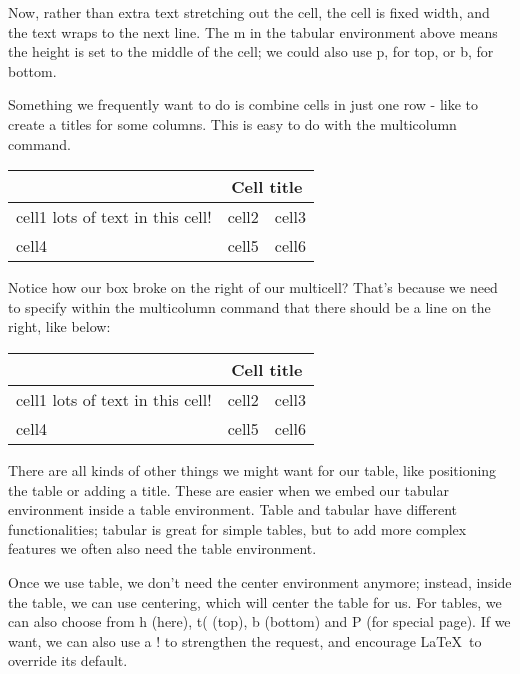 \documentclass{article}
\begin{document}
Now, rather than extra text stretching out the cell, the cell is fixed width, and the text wraps to the next line. The m in the tabular environment above means the height is set to the middle of the cell; we could also use p, for top, or b, for bottom.

Something we frequently want to do is combine cells in just one row - like to create a titles for some columns. This is easy to do with the multicolumn command.

\begin{center}
	\begin{tabular}{ | m{3cm} | m{1cm}| m{1cm} | } 
		\hline
		 & \multicolumn{2}{c}{Cell title} \\
		\hline
		cell1 lots of text in this cell! & cell2 & cell3 \\ 
		\hline
		cell4 & cell5 & cell6 \\ 
		\hline
	\end{tabular}
\end{center}


Notice how our box broke on the right of our multicell? That's because we need to specify within the multicolumn command that there should be a line on the right, like below:

\begin{center}
	\begin{tabular}{ | m{3cm} | m{1cm}| m{1cm} | } 
		\hline
		& \multicolumn{2}{c|}{Cell title}  \\
		\hline
		cell1 lots of text in this cell! & cell2 & cell3 \\ 
		\hline
		cell4 & cell5 & cell6 \\ 
		\hline
	\end{tabular}
\end{center}

There are all kinds of other things we might want for our table, like positioning the table or adding a title. These are easier when we embed our tabular environment inside a table environment. Table and tabular have different functionalities; tabular is great for simple tables, but to add more complex features we often also need the table environment.

Once we use table, we don't need the center environment anymore; instead, inside the table, we can use centering, which will center the table for us. For tables, we can also choose from h (here), t( (top), b (bottom) and P (for special page). If we want, we can also use a ! to strengthen the request, and encourage \LaTeX\ to override its default.
\end{document}

